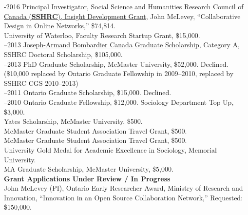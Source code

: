 \documentclass[9pt,usenames,dvipsnames]{article}
\begin{document}
-2016 Principal Investigator, \href{http://www.sshrc-crsh.gc.ca/funding-financement/programs-programmes/insight_development_grants-su
bventions_de_developpement_savoir-eng.aspx}{Social Science and Humanities Research Council of Canada (\textbf{SSHRC}), Insight Development Grant}, John McLevey, ``Collaborative Design in Online Networks,'' \$74,814. \\

 University of Waterloo, Faculty Research Startup Grant, \$15,000. \\

–2013 \href{http://www.sshrc-crsh.gc.ca/funding-financement/programs-programmes/fellowships/doctoral-doctorat-eng.aspx}{Joseph-Armand Bombardier Canada Graduate Scholarship}, Category A, SSHRC Doctoral Scholarship, \$105,000.\\

–2013 PhD Graduate Scholarship, McMaster University, \$52,000. Declined. (\$10,000 replaced by Ontario Graduate Fellowship in 2009–2010, replaced by SSHRC CGS 2010–2013)\\

–2011 Ontario Graduate Scholarship, \$15,000. Declined.\\

–2010 Ontario Graduate Fellowship, \$12,000. Sociology Department Top Up, \$3,000.\\

 Yates Scholarship, McMaster University, \$500.\\

 McMaster Graduate Student Association Travel Grant, \$500.\\

 McMaster Graduate Student Association Travel Grant, \$500.\\

 University Gold Medal for Academic Excellence in Sociology, Memorial University.\\

 MA Graduate Scholarship, McMaster University, \$5,000.\\


\noindent \textbf{Grant Applications Under Review / In Progress} \\

\ind John McLevey (PI), Ontario Early Researcher Award, Ministry of Research and Innovation, ``Innovation in an Open Source Collaboration Network,'' Requested: \$150,000. \\
\end{document}
